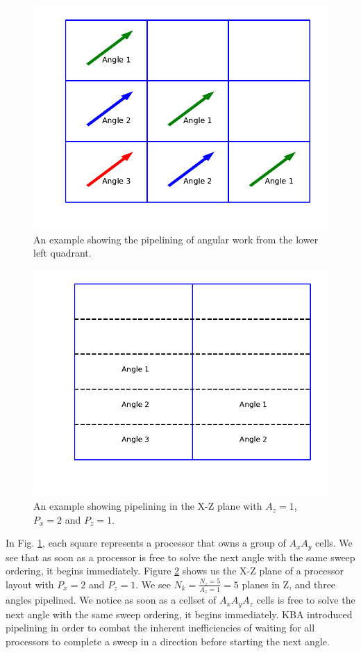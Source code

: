 \begin{figure}[h]
\centering
\includegraphics[scale=0.7]{../figures/pipeline_example.pdf}
\caption{An example showing the pipelining of angular work from the lower left quadrant.}
\label{pipeline_example}
\end{figure}
\begin{figure}[h]
\centering
\includegraphics[scale=0.7,trim={0cm 1cm 0cm 0cm},clip]{../figures/pipeline_example_3d.pdf}
\caption{An example showing pipelining in the X-Z plane with $A_z = 1$, $P_x = 2$ and $P_z = 1$.}
\label{pipeline_example_3d}
\end{figure}

In Fig. \ref{pipeline_example}, each square represents a processor that owns a group of $A_xA_y$ cells. We see that as soon as a processor is free to solve the next angle with the same sweep ordering, it begins immediately.
Figure \ref{pipeline_example_3d} shows us the X-Z plane of a processor layout with $P_x = 2$ and $P_z = 1$. We see $N_k=\frac{N_z = 5}{A_z = 1}=5$ planes in Z, and three angles pipelined. We notice as soon as a cellset of $A_xA_yA_z$ cells is free to solve the next angle with the same sweep ordering, it begins immediately.
KBA introduced pipelining in order to combat the inherent inefficiencies of waiting for all processors to complete a sweep in a direction before starting the next angle.

